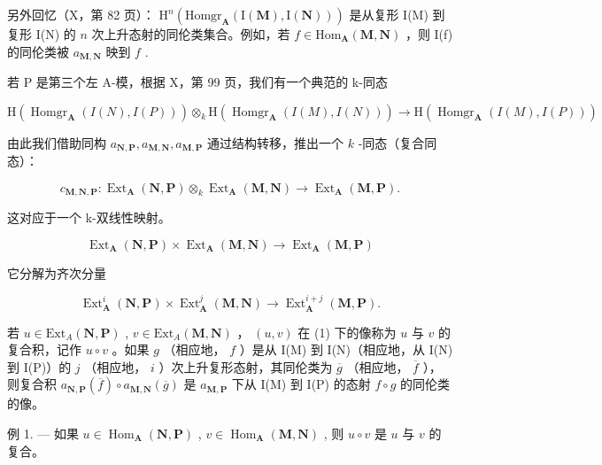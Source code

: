 另外回忆（X，第 82 页）： \(\mathrm{H}^n (\mathrm{Homgr}_{\mathbf{A}}(\mathrm{I}(\mathbf{M}),\mathrm{I}(\mathbf{N})))\) 是从复形 I(M) 到复形 I(N) 的 \(n\) 次上升态射的同伦类集合。例如，若 \(f\in \mathrm{Hom}_{\mathbf{A}}(\mathbf{M},\mathbf{N})\) ，则 I(f) 的同伦类被 \(a_{\mathbf{M},\mathbf{N}}\) 映到 \(f\) .

若 P 是第三个左 A-模，根据 X，第 99 页，我们有一个典范的 k-同态

\[
\mathrm{H} (\operatorname{Homgr} _ {\mathbf {A}} (I (N), I (P))) \otimes_ {k} \mathrm{H} (\operatorname{Homgr} _ {\mathbf {A}} (I (M), I (N))) \rightarrow \mathrm{H} (\operatorname{Homgr} _ {\mathbf {A}} (I (M), I (P)))
\]

由此我们借助同构 \(a_{\mathbf{N},\mathbf{P}}, a_{\mathbf{M},\mathbf{N}}, a_{\mathbf{M},\mathbf{P}}\) 通过结构转移，推出一个 \(k\) -同态（复合同态）：

\[
c _ {\mathbf {M}, \mathbf {N}, \mathbf {P}}: \operatorname{Ext} _ {\mathbf {A}} (\mathbf {N}, \mathbf {P}) \otimes_ {k} \operatorname{Ext} _ {\mathbf {A}} (\mathbf {M}, \mathbf {N}) \rightarrow \operatorname{Ext} _ {\mathbf {A}} (\mathbf {M}, \mathbf {P}).
\]

这对应于一个 k-双线性映射。

\[
\operatorname{Ext} _ {\mathbf {A}} (\mathbf {N}, \mathbf {P}) \times \operatorname{Ext} _ {\mathbf {A}} (\mathbf {M}, \mathbf {N}) \rightarrow \operatorname{Ext} _ {\mathbf {A}} (\mathbf {M}, \mathbf {P})\tag{1}
\]

它分解为齐次分量

\[
\operatorname{Ext} _ {\mathbf {A}} ^ {i} (\mathbf {N}, \mathbf {P}) \times \operatorname{Ext} _ {\mathbf {A}} ^ {j} (\mathbf {M}, \mathbf {N}) \rightarrow \operatorname{Ext} _ {\mathbf {A}} ^ {i + j} (\mathbf {M}, \mathbf {P}).\tag{2}
\]

若 \(u \in \text{Ext}_A(\mathbf{N}, \mathbf{P})\) , \(v \in \text{Ext}_A(\mathbf{M}, \mathbf{N})\) ， \((u, v)\) 在 (1) 下的像称为 \(u\) 与 \(v\) 的复合积，记作 \(u \circ v\) 。如果 \(g\) （相应地， \(f\) ）是从 I(M) 到 I(N)（相应地，从 I(N) 到 I(P)）的 \(j\) （相应地， \(i\) ）次上升复形态射，其同伦类为 \(\overline{g}\) （相应地， \(\overline{f}\) ），则复合积 \(a_{\mathbf{N},\mathbf{P}}(\overline{f}) \circ a_{\mathbf{M},\mathbf{N}}(\overline{g})\) 是 \(a_{\mathbf{M},\mathbf{P}}\) 下从 I(M) 到 I(P) 的态射 \(f \circ g\) 的同伦类的像。

例 1. --- 如果 \(u \in \operatorname{Hom}_{\mathbf{A}}(\mathbf{N}, \mathbf{P})\) , \(v \in \operatorname{Hom}_{\mathbf{A}}(\mathbf{M}, \mathbf{N})\) , 则 \(u \circ v\) 是 \(u\) 与 \(v\) 的复合。

